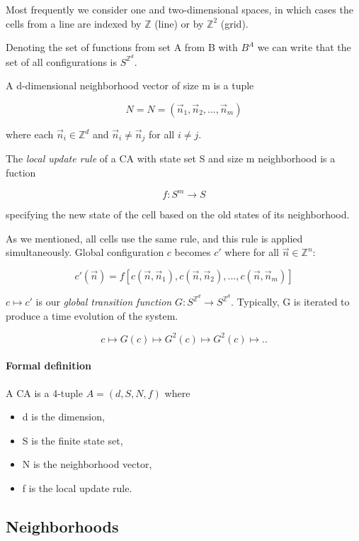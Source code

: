 Most frequently we consider one and two-dimensional spaces, in which cases the cells from a line are indexed by $\mathds{Z}$ (line) or by $\mathds{Z}^2$ (grid).

Denoting the set of functions from set A from B with $B^A$ we can write that the set of all configurations is $S^{\mathds{Z}^d}$.

A d-dimensional neighborhood vector of size m is a tuple

$$N = N = (\vec{n}_1,\vec{n}_2,...,\vec{n}_m) $$

where each $\vec{n}_i \in \mathds{Z}^d$ and $\vec{n}_i \neq \vec{n}_j$ for all $i \neq j$.

The \textit{local update rule} of a CA with state set S and size m neighborhood is a fuction

$$ f: S^m \rightarrow S$$

specifying the new state of the cell based on the old states of its neighborhood.

As we mentioned, all cells use the same rule, and this rule is applied simultaneously. Global configuration $c$ becomes $c'$ where for all $\vec{n} \in \mathds{Z}^n$:

$$c'(\vec{n}) = f[c(\vec{n}, \vec{n}_1),c(\vec{n}, \vec{n}_2), ... , c(\vec{n}, \vec{n}_m)]$$

$c \mapsto c' $ is our \textit{global transition function} $G: S^{\mathds{Z}^d} \longrightarrow S^{\mathds{Z}^d}$. Typically, G is iterated to produce a time evolution of the system.

$$ c \mapsto G(c) \mapsto G^2(c) \mapsto G^2(c) \mapsto..$$

\paragraph{Formal definition}

A CA is a 4-tuple $A=(d, S,N,f)$ where

\begin{itemize}
	\item d is the dimension,
	\item S is the finite state set,
	\item N is the neighborhood vector,
	\item f is the local update rule.
\end{itemize}

\subsection{Neighborhoods}


